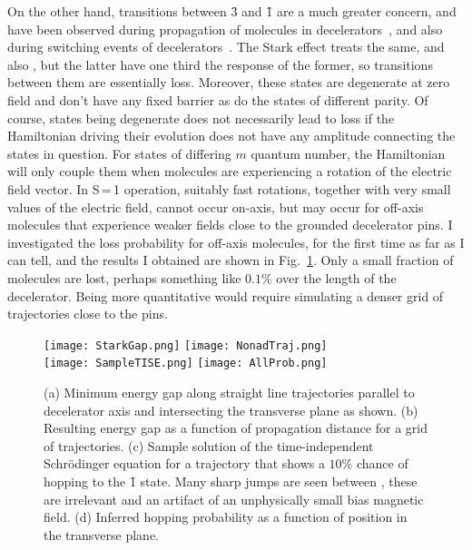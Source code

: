 On the other hand, transitions between \f3 and \f1 are a much greater concern, and have been observed during propagation of molecules in decelerators~\cite{Meek2011}, and also during switching events of decelerators~\cite{Wall2010}.
The Stark effect treats  the same, and also , but the latter have one third the response of the former, so transitions between them are essentially loss.
Moreover, these states are degenerate at zero field and don't have any fixed barrier as do the states of different parity.
Of course, states being degenerate does not necessarily lead to loss if the Hamiltonian driving their evolution does not have any amplitude connecting the states in question.
For states of differing $m$ quantum number, the Hamiltonian will only couple them when molecules are experiencing a rotation of the electric field vector.
In S\,=\,1 operation, suitably fast rotations, together with very small values of the electric field, cannot occur on-axis, but may occur for off-axis molecules that experience weaker fields close to the grounded decelerator pins.
I investigated the loss probability for off-axis molecules, for the first time as far as I can tell, and the results I obtained are shown in Fig.~\ref{non-adiabatic1}.
Only a small fraction of molecules are lost, perhaps something like $0.1\%$ over the length of the decelerator.
Being more quantitative would require simulating a denser grid of trajectories close to the pins.

\begin{figure}[t!]
\centering
\texttt{[image: StarkGap.png]}
\texttt{[image: NonadTraj.png]}\\
\texttt{[image: SampleTISE.png]}
\texttt{[image: AllProb.png]}
\caption[Non-adiabatic Transitions Off-Axis]{\label{non-adiabatic1}
(a) Minimum energy gap along straight line trajectories parallel to decelerator axis and intersecting the transverse plane as shown. (b) Resulting energy gap as a function of propagation distance for a grid of trajectories. (c) Sample solution of the time-independent Schr\"{o}dinger equation for a trajectory that shows a $10\%$ chance of hopping to the \f1 state. Many sharp jumps are seen between , these are irrelevant and an artifact of an unphysically small bias magnetic field. (d) Inferred hopping probability as a function of position in the transverse plane.
}
\end{figure}

